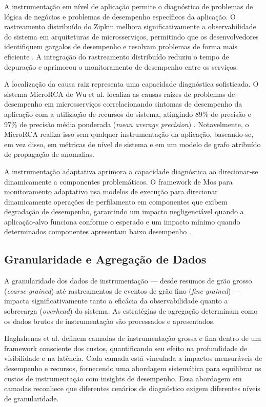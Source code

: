 \documentclass[sigconf, anonymous]{acmart}
\begin{document}
A instrumentação em nível de aplicação permite o diagnóstico de problemas de lógica de negócios e problemas de desempenho específicos da aplicação. O rastreamento distribuído do Zipkin melhora significativamente a observabilidade do sistema em arquiteturas de microsserviços, permitindo que os desenvolvedores identifiquem gargalos de desempenho e resolvam problemas de forma mais eficiente \cite{marvis_2024}. A integração do rastreamento distribuído reduziu o tempo de depuração e aprimorou o monitoramento de desempenho entre os serviços.

A localização da causa raiz representa uma capacidade diagnóstica sofisticada. O sistema MicroRCA de Wu et al. localiza as causas raízes de problemas de desempenho em microsserviços correlacionando sintomas de desempenho da aplicação com a utilização de recursos do sistema, atingindo 89\% de precisão e 97\% de precisão média ponderada (\textit{mean average precision}) \cite{wu_2020}. Notavelmente, o MicroRCA realiza isso sem qualquer instrumentação da aplicação, baseando-se, em vez disso, em métricas de nível de sistema e em um modelo de grafo atribuído de propagação de anomalias.

A instrumentação adaptativa aprimora a capacidade diagnóstica ao direcionar-se dinamicamente a componentes problemáticos. O framework de Mos para monitoramento adaptativo usa modelos de execução para direcionar dinamicamente operações de perfilamento em componentes que exibem degradação de desempenho, garantindo um impacto negligenciável quando a aplicação-alvo funciona conforme o esperado e um impacto mínimo quando determinados componentes apresentam baixo desempenho \cite{mos_2004}.

\subsection{Granularidade e Agregação de Dados} 

A granularidade dos dados de instrumentação — desde resumos de grão grosso (\textit{coarse-grained}) até rastreamentos de eventos de grão fino (\textit{fine-grained}) — impacta significativamente tanto a eficácia da observabilidade quanto a sobrecarga (\textit{overhead}) do sistema. As estratégias de agregação determinam como os dados brutos de instrumentação são processados e apresentados.

Haghshenas et al. \cite{haghshenas_2023} definem camadas de instrumentação grossa e fina dentro de um framework consciente dos custos, quantificando seu efeito na profundidade de visibilidade e na latência. Cada camada está vinculada a impactos mensuráveis de desempenho e recursos, fornecendo uma abordagem sistemática para equilibrar os custos de instrumentação com insights de desempenho. Essa abordagem em camadas reconhece que diferentes cenários de diagnóstico exigem diferentes níveis de granularidade.
\end{document}

